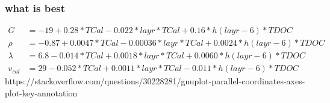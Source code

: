 \subsubsection{what is best}
\begin{align}
    G &=      -19 + 0.28 * TCal  - 0.022 * layr*TCal  +  0.16 * h(layr-6)*TDOC \\
    \rho &=  -0.87 + 0.0047 * TCal  - 0.00036 * layr*TCal  +  0.0024 * h(layr-6)*TDOC \\
    \lambda &=  6.8 - 0.014 * TCal  + 0.0018 * layr*TCal  + 0.0060 * h(layr-6)*TDOC \\
    v_{cal} &= 29 - 0.052 * TCal  + 0.0011 * layr*TCal  -  0.011 * h(layr-6)*TDOC 
    \label{eq:emma}
\end{align}
https://stackoverflow.com/questions/30228281/gnuplot-parallel-coordinates-axes-plot-key-annotation

